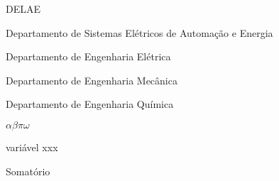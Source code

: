 
\tableofcontents
\listoffigures
\listoftables
\begin{listofabbrv}{DELAE}
        \item[DELAE] Departamento de Sistemas Elétricos de Automação e Energia
        \item[DELET] Departamento de Engenharia Elétrica
        \item[DEMEC] Departamento de Engenharia Mecânica
        \item[DEQUI] Departamento de Engenharia Química
\end{listofabbrv}
\begin{listofsymbols}{$\alpha\beta\pi\omega$}
       \item[$\alpha\beta\pi\omega$] variável xxx
       \item[$\sum$] Somatório
\end{listofsymbols}
